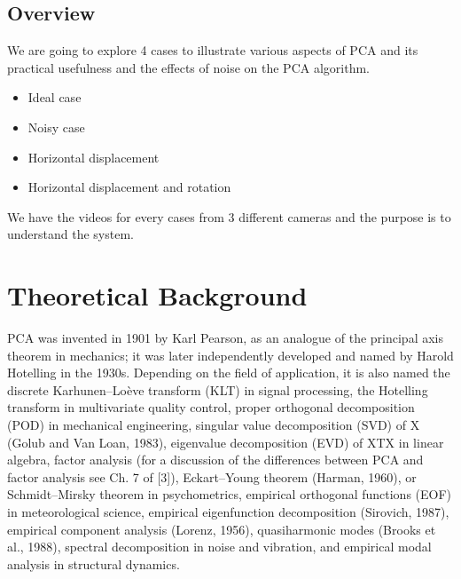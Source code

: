 \documentclass[twoside,twocolumn]{article}
\begin{document}
    \subsection{Overview}
    We are going to explore 4 cases to illustrate various aspects of PCA and its practical usefulness and the effects 
    of noise on the PCA algorithm.
    \begin{itemize}
        \item Ideal case
        \item Noisy case
        \item Horizontal displacement
        \item Horizontal displacement and rotation
    \end{itemize}
    We have the videos for every cases from 3 different cameras and the purpose is to understand the system. 
    \section{Theoretical Background}
    PCA was invented in 1901 by Karl Pearson, as an analogue of the principal axis theorem in mechanics; 
    it was later independently developed and named by Harold Hotelling in the 1930s. Depending on the field 
    of application, it is also named the discrete Karhunen–Loève transform (KLT) in signal processing, the 
    Hotelling transform in multivariate quality control, proper orthogonal decomposition (POD) in mechanical 
    engineering, singular value decomposition (SVD) of X (Golub and Van Loan, 1983), eigenvalue decomposition 
    (EVD) of XTX in linear algebra, factor analysis (for a discussion of the differences between PCA and factor
    analysis see Ch. 7 of [3]), Eckart–Young theorem (Harman, 1960), or Schmidt–Mirsky theorem in psychometrics,
    empirical orthogonal functions (EOF) in meteorological science, empirical eigenfunction decomposition 
    (Sirovich, 1987), empirical component analysis (Lorenz, 1956), quasiharmonic modes (Brooks et al., 1988),
    spectral decomposition in noise and vibration, and empirical modal analysis in structural dynamics.
\end{document}
